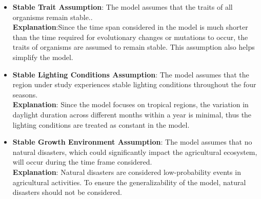 \documentclass{HZNUMCM}
\begin{document}
\begin{itemize}
        \item \textbf{Stable Trait Assumption}: The model assumes that the traits of all organisms remain stable..\\
        \textbf{Explanation}:Since the time span considered in the model is much shorter than the time required for evolutionary changes or mutations to occur,
         the traits of organisms are assumed to remain stable. This assumption also helps simplify the model.
        
        \item \textbf{Stable Lighting Conditions Assumption}: The model assumes that the region under study experiences stable lighting conditions throughout the four seasons.\\
        \textbf{Explanation}: Since the model focuses on tropical regions, the variation in daylight duration across different months within a year is minimal,
         thus the lighting conditions are treated as constant in the model.
        
        \item \textbf{Stable Growth Environment Assumption}: The model assumes that no natural disasters,
         which could significantly impact the agricultural ecosystem, will occur during the time frame considered.\\
        \textbf{Explanation}: Natural disasters are considered low-probability events in agricultural activities.
         To ensure the generalizability of the model, natural disasters should not be considered.
      \end{itemize}
\end{document}
